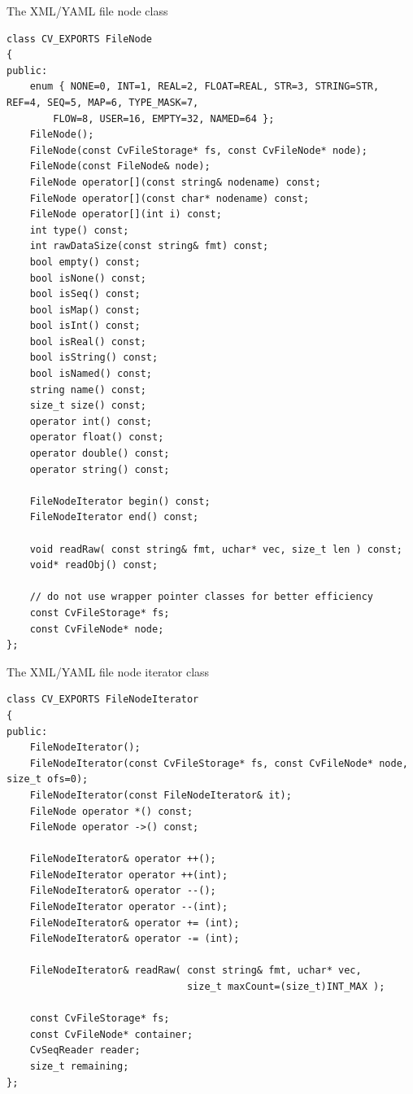 \label{FileNode}
The XML/YAML file node class

\begin{lstlisting}
class CV_EXPORTS FileNode
{
public:
    enum { NONE=0, INT=1, REAL=2, FLOAT=REAL, STR=3, STRING=STR, REF=4, SEQ=5, MAP=6, TYPE_MASK=7,
        FLOW=8, USER=16, EMPTY=32, NAMED=64 };
    FileNode();
    FileNode(const CvFileStorage* fs, const CvFileNode* node);
    FileNode(const FileNode& node);
    FileNode operator[](const string& nodename) const;
    FileNode operator[](const char* nodename) const;
    FileNode operator[](int i) const;
    int type() const;
    int rawDataSize(const string& fmt) const;
    bool empty() const;
    bool isNone() const;
    bool isSeq() const;
    bool isMap() const;
    bool isInt() const;
    bool isReal() const;
    bool isString() const;
    bool isNamed() const;
    string name() const;
    size_t size() const;
    operator int() const;
    operator float() const;
    operator double() const;
    operator string() const;

    FileNodeIterator begin() const;
    FileNodeIterator end() const;

    void readRaw( const string& fmt, uchar* vec, size_t len ) const;
    void* readObj() const;

    // do not use wrapper pointer classes for better efficiency
    const CvFileStorage* fs;
    const CvFileNode* node;
};
\end{lstlisting}

\label{FileNode}
The XML/YAML file node iterator class

\begin{lstlisting}
class CV_EXPORTS FileNodeIterator
{
public:
    FileNodeIterator();
    FileNodeIterator(const CvFileStorage* fs, const CvFileNode* node, size_t ofs=0);
    FileNodeIterator(const FileNodeIterator& it);
    FileNode operator *() const;
    FileNode operator ->() const;

    FileNodeIterator& operator ++();
    FileNodeIterator operator ++(int);
    FileNodeIterator& operator --();
    FileNodeIterator operator --(int);
    FileNodeIterator& operator += (int);
    FileNodeIterator& operator -= (int);

    FileNodeIterator& readRaw( const string& fmt, uchar* vec,
                               size_t maxCount=(size_t)INT_MAX );

    const CvFileStorage* fs;
    const CvFileNode* container;
    CvSeqReader reader;
    size_t remaining;
};
\end{lstlisting}

